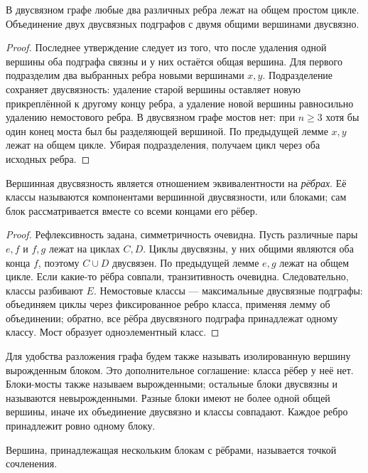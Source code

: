 \begin{lemma}\label{lem:blocks}
В двусвязном графе любые два различных ребра лежат на общем простом цикле.
Объединение двух двусвязных подграфов с двумя общими вершинами двусвязно.
\end{lemma}
\begin{proof}
Последнее утверждение следует из того, что после удаления одной вершины
оба подграфа связны и у них остаётся общая вершина.
Для первого подразделим два выбранных ребра новыми вершинами \(x,y\).
Подразделение сохраняет двусвязность: удаление старой вершины оставляет
новую прикреплённой к другому концу ребра, а удаление новой вершины
равносильно удалению немостового ребра. В двусвязном графе мостов нет:
при \(n\ge3\) хотя бы один конец моста был бы разделяющей вершиной.
По предыдущей лемме \(x,y\) лежат на общем цикле. Убирая подразделения,
получаем цикл через оба исходных ребра.
\end{proof}
\begin{theorem}
Вершинная двусвязность является отношением эквивалентности на \emph{рёбрах}.
Её классы называются компонентами вершинной двусвязности, или блоками;
сам блок рассматривается вместе со всеми концами его рёбер.
\end{theorem}
\begin{proof}
Рефлексивность задана, симметричность очевидна. Пусть различные пары
\(e,f\) и \(f,g\) лежат на циклах \(C,D\). Циклы двусвязны, у них общими
являются оба конца \(f\), поэтому \(C\cup D\) двусвязен.
По предыдущей лемме \(e,g\) лежат на общем цикле. Если какие-то рёбра
совпали, транзитивность очевидна. Следовательно, классы разбивают \(E\).
Немостовые классы — максимальные двусвязные подграфы: объединяем
циклы через фиксированное ребро класса, применяя лемму об объединении;
обратно, все рёбра двусвязного подграфа принадлежат одному классу.
Мост образует одноэлементный класс.
\end{proof}
Для удобства разложения графа будем также называть изолированную вершину
вырожденным блоком. Это дополнительное соглашение: класса рёбер у неё нет.
Блоки-мосты также называем вырожденными; остальные блоки двусвязны
и называются невырожденными.
Разные блоки имеют не более одной общей вершины, иначе их объединение
двусвязно и классы совпадают. Каждое ребро принадлежит ровно одному блоку.
\begin{definition}
Вершина, принадлежащая нескольким блокам с рёбрами, называется точкой сочленения.
\end{definition}
